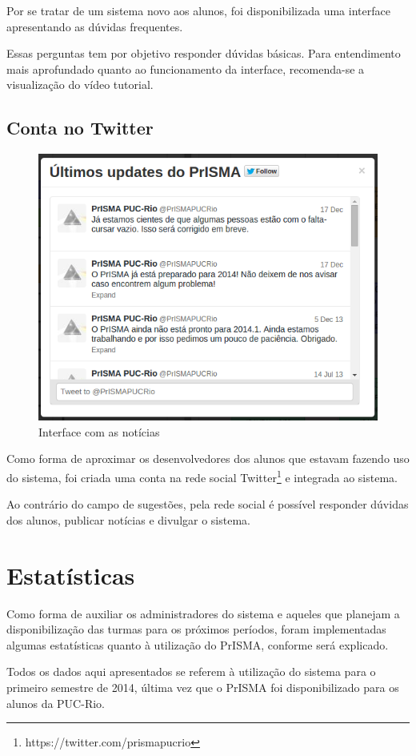 \documentclass[graduacao,brazil]{ThesisPUC}
\begin{document}
Por se tratar de um sistema novo aos alunos, foi disponibilizada uma interface apresentando as dúvidas frequentes. 

Essas perguntas tem por objetivo responder dúvidas básicas. Para entendimento mais aprofundado quanto ao funcionamento da interface, recomenda-se a visualização do vídeo tutorial.

\newpage
\subsection{Conta no Twitter}

\begin{figure}[H]
    \centering
    \includegraphics[width=0.6\linewidth]{img/v3_noticias.png}
    \caption{Interface com as notícias}
\end{figure}

Como forma de aproximar os desenvolvedores dos alunos que estavam fazendo uso do sistema, foi criada uma conta na rede social Twitter\footnote{https://twitter.com/prismapucrio} e integrada ao sistema. 

Ao contrário do campo de sugestões, pela rede social é possível responder dúvidas dos alunos, publicar notícias e divulgar o sistema.

\section{Estatísticas}

Como forma de auxiliar os administradores do sistema e aqueles que planejam a disponibilização das turmas para os próximos períodos, foram implementadas algumas estatísticas quanto à utilização do PrISMA, conforme será explicado. 

Todos os dados aqui apresentados se referem à utilização do sistema para o primeiro semestre de 2014, última vez que o PrISMA foi disponibilizado para os alunos da PUC-Rio.
\end{document}
